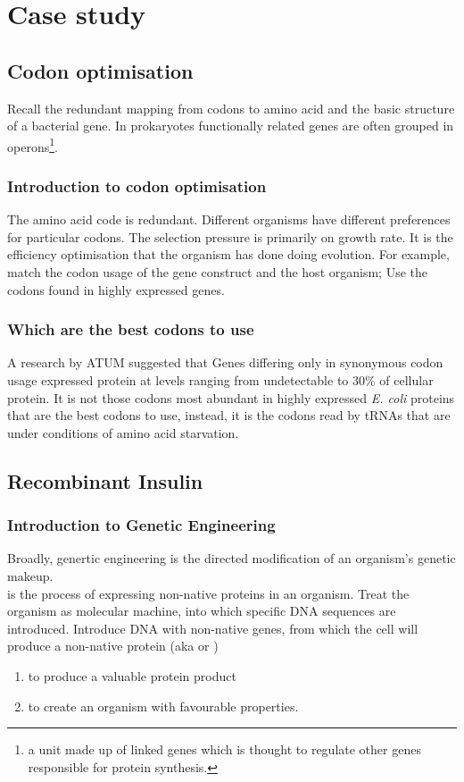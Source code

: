 \chapter{Case study}

\section{Codon optimisation}
Recall the redundant mapping from codons to amino acid and the basic structure of a bacterial gene. In prokaryotes functionally related genes are often grouped in operons\footnote{a unit made up of linked genes which is thought to regulate other genes responsible for protein synthesis.}.
\subsection{Introduction to codon optimisation}
The amino acid code is redundant. Different organisms have different preferences for particular codons. The selection pressure is primarily on growth rate. It is the efficiency optimisation that the organism has done doing evolution. For example, match the codon usage of the gene construct and the host organism; Use the codons found in highly expressed genes.
\subsection{Which are the best codons to use}
A research by ATUM suggested that Genes differing only in synonymous codon usage expressed protein at levels ranging from undetectable to 30\% of cellular protein. It is not those codons most abundant in highly expressed \textit{E. coli} proteins that are the best codons to use, instead, it is the codons read by tRNAs that are  under conditions of amino acid starvation.

\section{Recombinant Insulin}
\subsection{Introduction to Genetic Engineering}
Broadly, genertic engineering is the directed modification of an organism's genetic makeup.\\[.1in]
 is the process of expressing non-native proteins in an organism. Treat the organism as molecular machine, into which specific DNA sequences are introduced. Introduce DNA with non-native genes, from which the cell will produce a non-native protein (aka  or )
\begin{enumerate}[itemsep=0mm]
    \item to produce a valuable protein product
    \item to create an organism with favourable properties.
\end{enumerate}
